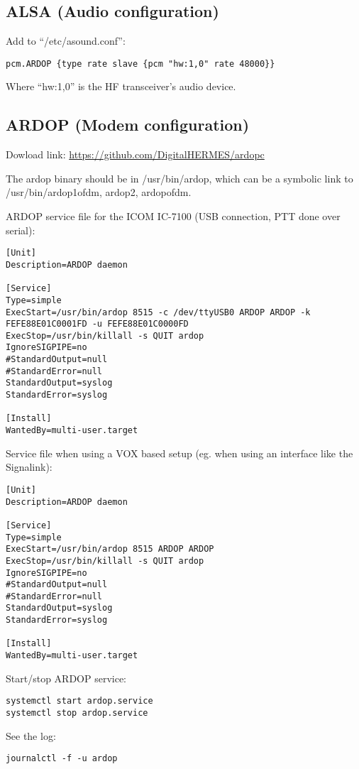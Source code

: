 \documentclass[11pt,a4paper]{article}
\begin{document}
\subsection{ALSA (Audio configuration)}

Add to ``/etc/asound.conf'':
\begin{verbatim}
pcm.ARDOP {type rate slave {pcm "hw:1,0" rate 48000}}
\end{verbatim}

Where ``hw:1,0'' is the HF transceiver's audio device.

\subsection{ARDOP (Modem configuration)}

Dowload link: \url{https://github.com/DigitalHERMES/ardopc}

The ardop binary should be in /usr/bin/ardop, which can be a
symbolic link to /usr/bin/{ardop1ofdm, ardop2, ardopofdm}.

ARDOP service file for the ICOM IC-7100 (USB connection, PTT done over serial):
\begin{verbatim}
[Unit]
Description=ARDOP daemon

[Service]
Type=simple
ExecStart=/usr/bin/ardop 8515 -c /dev/ttyUSB0 ARDOP ARDOP -k FEFE88E01C0001FD -u FEFE88E01C0000FD
ExecStop=/usr/bin/killall -s QUIT ardop
IgnoreSIGPIPE=no
#StandardOutput=null
#StandardError=null
StandardOutput=syslog
StandardError=syslog

[Install]
WantedBy=multi-user.target
\end{verbatim}

Service file when using a VOX based setup (eg. when using an interface like
the Signalink):
\begin{verbatim}
[Unit]
Description=ARDOP daemon

[Service]
Type=simple
ExecStart=/usr/bin/ardop 8515 ARDOP ARDOP
ExecStop=/usr/bin/killall -s QUIT ardop
IgnoreSIGPIPE=no
#StandardOutput=null
#StandardError=null
StandardOutput=syslog
StandardError=syslog

[Install]
WantedBy=multi-user.target
\end{verbatim}


Start/stop ARDOP service:
\begin{verbatim}
systemctl start ardop.service
systemctl stop ardop.service
\end{verbatim}


See the log:
\begin{verbatim}
journalctl -f -u ardop
\end{verbatim}
\end{document}
